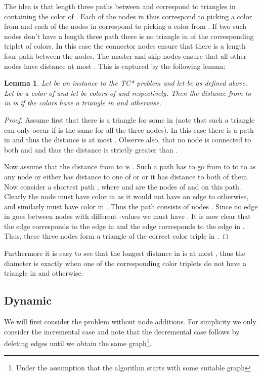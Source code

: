 \documentclass[a4paper,11pt]{article}
\newtheorem{lemma}{Lemma}
\theoremstyle{definition}
\begin{document}
The idea is that length three paths between  and  correspond to
triangles in  containing the color  of . Each of the  nodes in
 thus correspond to picking a color from  and each of the  nodes in
 correspond to picking a color from . If two such nodes don't have a
length three path there is no triangle in  of the corresponding triplet of
colors. In this case the connector nodes ensure that there is a length four
path between the nodes. The master and skip nodes ensure that all other nodes
have distance at most . This is captured by the following lemma:

\begin{lemma}\label{lem:diam_graph}
    Let  be an instance to the TC* problem and let  be as
    defined above. Let  be a color of 
    and let  be colors of  and  respectively. Then
    the distance from  to  in  is 
    if the colors  have a triangle in  and  otherwise.
\end{lemma}
\begin{proof}
    Assume first that there is a triangle  for some  in  (note that such a triangle can only
    occur if  is the same for all the three nodes). In this case there is a
    path  in
     and thus the distance is at most . Observe also, that
    no node is connected to both  and  and thus the distance is
    strictly greater than .

    Now assume that the distance from  to  is . Such
    a path has to go from  to  to  to  as any node  or  either has distance  to one of  or
     or it has distance  to both of them. Now consider a shortest
    path , where  and  are the nodes of 
    and  on this path. Clearly the node  must have color  in 
    as it would not have an edge to  otherwise, and similarly 
    must have color  in . Thus the path consists of nodes
    . Since no edge in
     goes between nodes with different -values we must have . It
    is now clear that the edge  corresponds to
    the edge  in  and the edge
     corresponds to the edge 
    in . Thus, these three nodes form a triangle of the correct color triple
    in .
\end{proof}
Furthermore it is easy to see that the longest distance in  is
at most , thus the diameter is  exactly when one of the corresponding
color triplets do not have a triangle in  and  otherwise.

\subsection{Dynamic}
We will first consider the problem without node additions. For simplicity we
only consider the incremental case and note that the decremental case follows
by deleting edges until we obtain the same graph\footnote{Under the assumption
that the algorithm starts with some suitable graph}.
\end{document}
